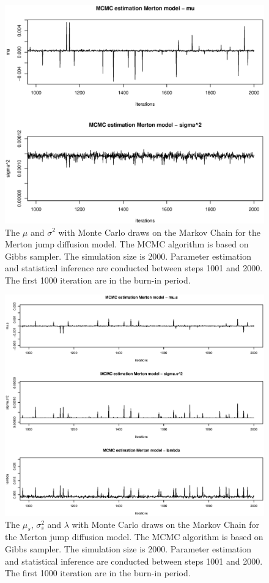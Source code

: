 \documentclass[11pt,reqno,final]{amsart}
\begin{document}
\begin{figure}[H]
  \centering
  \includegraphics[scale=0.6]{merton_mu_sigma.eps}
  \caption{The $\mu$ and $\sigma^2$ with Monte Carlo draws on the Markov Chain for the Merton jump diffusion model. The MCMC algorithm is based on Gibbs sampler. The simulation size is 2000. Parameter estimation and statistical inference are conducted between steps 1001 and 2000. The first 1000 iteration are in the burn-in period.}\label{mu_sigma_merton}
\end{figure}

\begin{figure}[H]
  \centering
  \includegraphics[scale=0.6]{merton_mus_sigmas_lambda.eps}
  \caption{The $\mu_s$, $\sigma_s^2$ and $\lambda$ with Monte Carlo draws on the Markov Chain for the Merton jump diffusion model. The MCMC algorithm is based on Gibbs sampler. The simulation size is 2000. Parameter estimation and statistical inference are conducted between steps 1001 and 2000. The first 1000 iteration are in the burn-in period.}\label{mus_sigmas_lambda_merton}
\end{figure}
\end{document}

